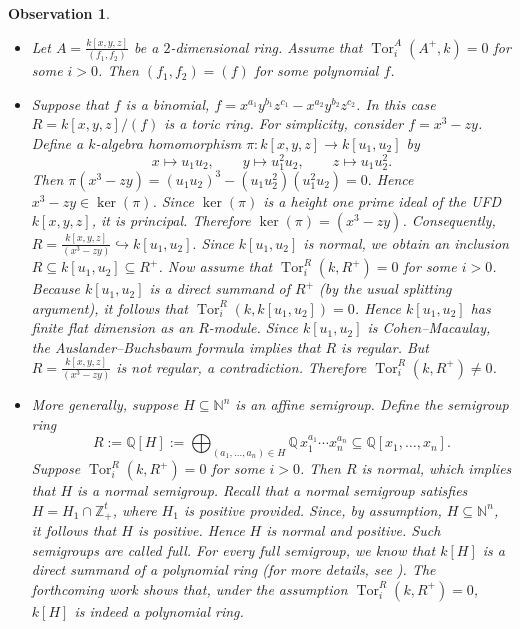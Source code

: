 \documentclass[11pt,a4paper]{amsart}
\numberwithin{equation}{section}
\newtheorem{observation}[theorem]{Observation}
\theoremstyle{definition}
\theoremstyle{remark}
\begin{document}
 \begin{observation}
 	\begin{itemize}
 		\item[(i)] Let \(A = \frac{k[x,y,z]}{(f_1,f_2)}\) be a \(2\)-dimensional ring. Assume that \(\operatorname{Tor}_i^A(A^{+}, k) = 0\) for some \(i > 0\). Then \((f_1,f_2) = (f)\) for some polynomial \(f\).
 		
 		\item[(ii)] Suppose that \(f\) is a binomial, \(f = x^{a_1}y^{b_1}z^{c_1} - x^{a_2}y^{b_2}z^{c_2}\). In this case \(R = k[x,y,z]/(f)\) is a toric ring. For simplicity, consider \(f = x^3 - zy\). Define a \(k\)-algebra homomorphism \(\pi: k[x,y,z] \longrightarrow k[u_1,u_2]\) by
 		\[
 		x \longmapsto u_1u_2, \qquad y \longmapsto u_1^2u_2, \qquad z \longmapsto u_1u_2^2.
 		\]
 		Then
 		\(
 		\pi(x^3 - zy) = (u_1u_2)^3 - (u_1u_2^2)(u_1^2u_2) = 0.
 		\)
 		Hence \(x^3 - zy \in \ker(\pi)\). Since \(\ker(\pi)\) is a height one prime ideal of the UFD \(k[x,y,z]\), it is principal. Therefore \(\ker(\pi) = (x^3 - zy)\). Consequently,
 		\(
 		R = \frac{k[x,y,z]}{(x^3 - zy)} \hookrightarrow k[u_1,u_2].
 		\)
 		Since \(k[u_1,u_2]\) is normal, we obtain an inclusion \(R \subseteq k[u_1,u_2] \subseteq R^{+}\). Now assume that \(\operatorname{Tor}_i^R(k, R^{+}) = 0\) for some \(i > 0\). Because \(k[u_1,u_2]\) is a direct summand of \(R^{+}\) (by the usual splitting argument), it follows that \(\operatorname{Tor}_i^R(k, k[u_1,u_2]) = 0\). Hence \(k[u_1,u_2]\) has finite flat dimension as an \(R\)-module. Since \(k[u_1,u_2]\) is Cohen--Macaulay, the Auslander--Buchsbaum formula implies that \(R\) is regular. But \(R = \frac{k[x,y,z]}{(x^3 - zy)}\) is not regular, a contradiction. Therefore \(\operatorname{Tor}_i^R(k, R^{+}) \neq 0\).
 		
 		\item[(iii)] More generally, suppose \(H \subseteq \mathbb{N}^n\) is an affine semigroup. Define the semigroup ring
 		\[
 		R := \mathbb{Q}[H] := \bigoplus_{(a_1,\ldots,a_n) \in H} \mathbb{Q}\, x_1^{a_1}\cdots x_n^{a_n} \subseteq \mathbb{Q}[x_1,\ldots,x_n].
 		\]
 		Suppose \(\operatorname{Tor}_i^R(k, R^+) = 0\) for some \(i > 0\). Then \(R\) is normal, which implies that \(H\) is a normal semigroup. Recall that a normal semigroup satisfies \(H = H_1 \cap \mathbb{Z}_+^t\), where \(H_1\) is positive provided. Since, by assumption, \(H \subseteq \mathbb{N}^n\), it follows that \(H\) is positive. Hence \(H\) is normal and positive. Such semigroups are called \emph{full}. For every full semigroup, we know that \(k[H]\) is a direct summand of a polynomial ring (for more details, see \cite[Section 6.1]{BH}). The forthcoming work \cite{MP} shows that, under the assumption \(\operatorname{Tor}_i^R(k, R^+) = 0\), \(k[H]\) is indeed a polynomial ring.
 	\end{itemize}
 \end{observation}
\end{document}

